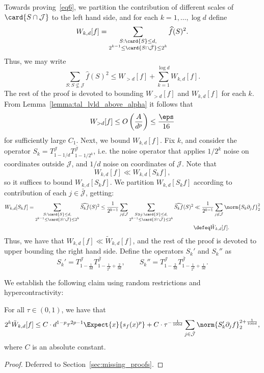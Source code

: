 Towards proving~\eqref{eq6}, we partition the contribution of different scales of
$\card{S\cap \mathcal{J}}$ to the left hand side, and for each $k=1,\ldots,\log d$ define
\[
W_{k,d}[f] = \sum\limits_{\substack{S: \card{S}\leq d,\\ 2^{k-1}\leq \card{S\cap \bar{\mathcal{J}}}\leq 2^k}}\widehat{f}(S)^2.
\]
Thus, we may write
\begin{equation}\label{eq:super_frid1}
  \sum\limits_{S: S\not\subseteq \mathcal{J}}\widehat{f}(S)^2
  \leq
  W_{>d}[f]
  +
  \sum\limits_{k=1}^{\log d} W_{k,d}[f].
\end{equation}
The rest of the proof is devoted to bounding $W_{>d}[f]$ and $W_{k,d}[f]$ for each $k$.
From Lemma~\ref{lemma:tal_lvld_above_alpha} it follows that
\begin{equation}\label{eq:super_frid}
  W_{>d}[f]\leq O\left(\frac{A}{d^p}\right) \leq \frac{\eps}{16}
\end{equation}
for sufficiently large $C_1$. Next, we bound $W_{k,d}[f]$. Fix $k$, and consider the operator $S_k = T_{1-1/d}^{\mathcal{J}}T_{1-1/2^{k}}^{\bar{\mathcal{J}}}$,
i.e. the noise operator that applies $1/2^k$ noise on coordinates outside $\mathcal{J}$, and $1/d$ noise on coordinates of $\mathcal{J}$. Note that
\[
W_{k,d}[f] \ll W_{k,d}[S_k f],
\]
so it suffices to bound $W_{k,d}[S_k f]$. We partition $W_{k,d}[S_k f]$ according to contribution of each $j\in\bar{\mathcal{J}}$, getting:
\begin{align*}
W_{k,d}[S_k f]
=\sum\limits_{\substack{S: \card{S}\leq d,\\ 2^{k-1}\leq \card{S\cap \bar{\mathcal{J}}}\leq 2^k}} \widehat{S_k f}(S)^2
\leq \frac{1}{2^{k-1}} \sum\limits_{j\not\in\mathcal{J}}\sum\limits_{\substack{S\ni j: \card{S}\leq d,\\ 2^{k-1}\leq \card{S\cap \bar{\mathcal{J}}}\leq 2^k}} \widehat{S_k f}(S)^2
&\ll \frac{1}{2^{k-1}} \sum\limits_{j\not\in\mathcal{J}}\norm{S_k \partial_j f}_2^2\\
&\defeq \tilde{W}_{k,d}[f].
\end{align*}
Thus, we have that $W_{k,d}[f]\ll \tilde{W}_{k,d}[f]$, and the rest of the proof is devoted to upper bounding the right hand side.
Define the operators $S_{k}'$ and $S_k''$ as
\[
S_k' = T_{1-\frac{1}{3d}}^{\mathcal{J}}T_{1-\frac{1}{2^{k}}+\frac{2}{3d}}^{\bar{\mathcal{J}}},
\qquad
S_k'' = T_{1-\frac{2}{3d}}^{\mathcal{J}}T_{1-\frac{1}{2^{k}}+\frac{1}{3d}}^{\bar{\mathcal{J}}}.
\]

We establish the following claim using random restrictions and hypercontractivity:
\begin{claim}\label{claim:super_fried_main}
  For all $\tau\in (0,1)$, we have that
  \[
  2^k \tilde{W}_{k,d}[f]\leq
  C\cdot d^{1-p}\tau^{2p-1} \Expect{x}{s_f(x)^p} + C\cdot\tau^{-\frac{1}{100 d}}\sum\limits_{j\in\bar{\mathcal{J}}} \norm{S_k' \partial_j f}_2^{2+\frac{1}{100d}},
  \]
  where $C$ is an absolute constant.
\end{claim}
\begin{proof}
  Deferred to Section~\ref{sec:missing_proofs}.
\end{proof}

